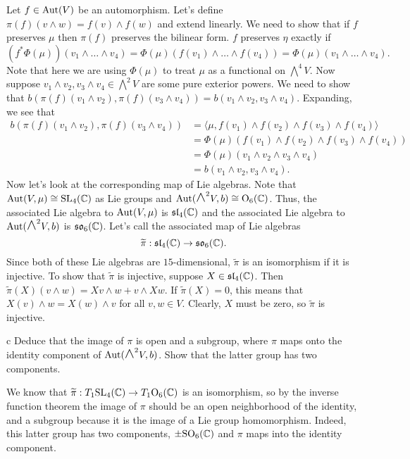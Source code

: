 \documentclass{pset}
\begin{document}
\begin{solution}
  Let $f \in \textrm{Aut}(V)$ be an automorphism. Let's define $\pi(f)(v\wedge w) = f(v)\wedge f(w)$ and extend linearly. We need to show that if $f$ preserves $\mu$ then $\pi(f)$ preserves the bilinear form. $f$ preserves $\eta$ exactly if 
  \[
    (f^*\Phi(\mu))(v_1\wedge\ldots\wedge v_4) = \Phi(\mu)(f(v_1)\wedge\ldots\wedge f(v_4)) = \Phi(\mu)(v_1\wedge \ldots\wedge v_4).
  \]
  Note that here we are using $\Phi(\mu)$ to treat $\mu$ as a functional on $\bigwedge^4 V$. Now suppose $v_1\wedge v_2, v_3\wedge v_4 \in \bigwedge^2 V$ are some pure exterior powers. We need to show that $b(\pi(f)(v_1\wedge v_2), \pi(f)(v_3\wedge v_4)) = b(v_1\wedge v_2, v_3\wedge v_4)$. Expanding, we see that
  \[
    \begin{aligned}
      b(\pi(f)(v_1\wedge v_2), \pi(f)(v_3\wedge v_4)) &= \langle \mu, f(v_1)\wedge f(v_2)\wedge f(v_3)\wedge f(v_4)\rangle\\
                                                      &= \Phi(\mu)(f(v_1)\wedge f(v_2)\wedge f(v_3)\wedge f(v_4))\\
                                                      &= \Phi(\mu)(v_1\wedge v_2\wedge v_3 \wedge v_4)\\
                                                      &= b(v_1\wedge v_2, v_3\wedge v_4).
    \end{aligned}
  \]
  Now let's look at the corresponding map of Lie algebras. 
  Note that $\textrm{Aut}(V,\mu) \cong \mathrm{SL}_4(\mathbb{C})$ as Lie groups and $\Aut(\bigwedge^2 V, b)\cong \O_6(\C)$. Thus, the associated Lie algebra to $\textrm{Aut}(V, \mu)$ is $\mathfrak{sl}_4(\mathbb{C})$ and the associated Lie algebra to $\Aut(\bigwedge^2 V, b)$ is $\mathfrak{so}_6(\mathbb{C})$. Let's call the associated map of Lie algebras
  \[
    \widetilde{\pi} : \mathfrak{sl}_4(\mathbb{C}) \to \mathfrak{so}_6(\mathbb{C}).
  \]
  Since both of these Lie algebras are $15$-dimensional, $\widetilde{\pi}$ is an isomorphism if it is injective. To show that $\widetilde{\pi}$ is injective, suppose $X\in \mathfrak{sl}_4(\mathbb{C})$. Then $\widetilde{\pi}(X)(v\wedge w) = Xv\wedge w + v\wedge Xw$. If $\widetilde{\pi}(X)=0$, this means that $X(v)\wedge w=X(w)\wedge v$ for all $v,w\in V$. Clearly, $X$ must be zero, so $\widetilde{\pi}$ is injective.

  \begin{part}{c}
    Deduce that the image of $\pi$ is open and a subgroup, where $\pi$ maps onto the identity component of $\Aut(\bigwedge^2 V, b)$. Show that the latter group has two components.
  \end{part}

  We know that $\widetilde{\pi} : T_1 \mathrm{SL}_4(\mathbb{C}) \to T_1 \mathrm{O}_6(\mathbb{C})$ is an isomorphism, so by the inverse function theorem the image of $\pi$ should be an open neighborhood of the identity, and a subgroup because it is the image of a Lie group homomorphism. Indeed, this latter group has two components, $\pm \mathrm{SO}_6(\mathbb{C})$ and $\pi$ maps into the identity component.


\end{solution}
\end{document}
